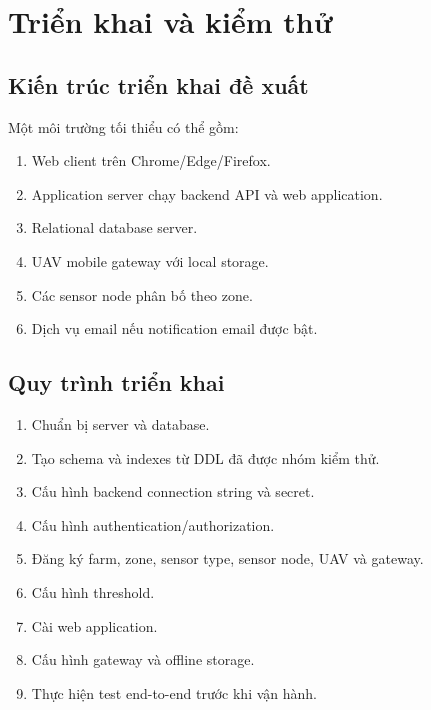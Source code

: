 
\chapter{Triển khai và kiểm thử}

\section{Kiến trúc triển khai đề xuất}
Một môi trường tối thiểu có thể gồm:
\begin{enumerate}
  \item Web client trên Chrome/Edge/Firefox.
  \item Application server chạy backend API và web application.
  \item Relational database server.
  \item UAV mobile gateway với local storage.
  \item Các sensor node phân bố theo zone.
  \item Dịch vụ email nếu notification email được bật.
\end{enumerate}

\section{Quy trình triển khai}
\begin{enumerate}
  \item Chuẩn bị server và database.
  \item Tạo schema và indexes từ DDL đã được nhóm kiểm thử.
  \item Cấu hình backend connection string và secret.
  \item Cấu hình authentication/authorization.
  \item Đăng ký farm, zone, sensor type, sensor node, UAV và gateway.
  \item Cấu hình threshold.
  \item Cài web application.
  \item Cấu hình gateway và offline storage.
  \item Thực hiện test end-to-end trước khi vận hành.
\end{enumerate}

